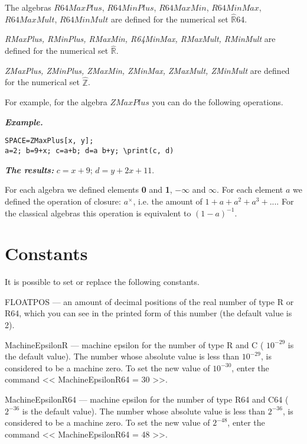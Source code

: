 The algebras $R64MaxPlus$, $R64MinPlus$, $R64MaxMin$, $R64MinMax$, $ R64MaxMult$, $ R64MinMult$ are defined for the numerical set $\hat {\mathbb {R}}$64. 

{\it RMaxPlus, RMinPlus, RMaxMin, R64MinMax, RMaxMult, RMinMult}  are defined for the numerical set $\hat {\mathbb {R}}$. 

{\it   ZMaxPlus,  ZMinPlus, ZMaxMin, ZMinMax, ZMaxMult,  ZMinMult}  are defined for the numerical set $\hat {\mathbb {Z}}$. 
 
 
For example, for the algebra $ ZMaxPlus $ you can do the following operations.
\smallskip

 {\it \bf Example. }

\vspace*{-3mm}

\begin{verbatim}
SPACE=ZMaxPlus[x, y];
a=2; b=9+x; c=a+b; d=a b+y; \print(c, d)
\end{verbatim}

{\it  \bf The results:} $c = x+9$;  $d = y+2 x+11$.

For each algebra we defined elements {\bf 0} and {\bf 1}, $-\infty$ and $\infty$.
For each element $a$ we defined the operation of closure: $ a^{\times}$, i.e. the amount of $1+a+a^2+a^3+...$.
For the classical algebras this operation is equivalent to $(1-a)^{-1}$. 
 
\section{Constants} 
It is possible to set or replace the following constants.

FLOATPOS --- an amount of decimal positions of the  real number of type R or R64, 
which you can see in the printed form of this number (the default value is 2).

MachineEpsilonR --- machine epsilon for the number of type R and C ( $10^{-29}$ is the  default value).
The number whose absolute value is less than $10^{-29}$, is considered to be a machine zero.
To set the new value of $ 10^{- 30} $, enter the command << MachineEpsilonR64 = 30 >>.

MachineEpsilonR64 --- machine epsilon for the number of type R64 and C64 ( $2^{-36}$ is the  default value).
The number whose absolute value is less than $2^{-36}$, is considered to be a machine zero.
To set the new value of $2^{-48}$, enter the command << MachineEpsilonR64 = 48 >>.

